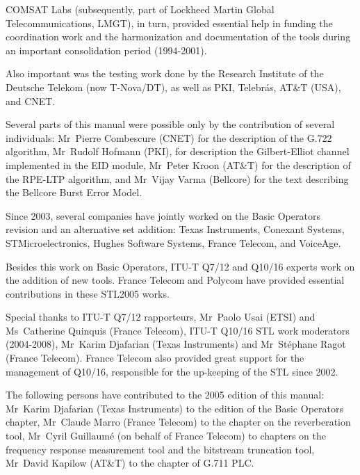 COMSAT Labs (subsequently, part of Lockheed Martin Global Telecommunications, LMGT), in turn, provided essential help in funding the coordination work and the harmonization and documentation of the tools during an important consolidation period (1994-2001).

Also important was the testing work done by the Research Institute of the Deutsche Telekom (now T-Nova/DT), as well as PKI, Telebr\'{a}s, AT\&T (USA), and CNET.

Several parts of this manual were possible only by the contribution of several individuals: Mr~Pierre Combescure (CNET) for the description of the G.722 algorithm, Mr~Rudolf Hofmann (PKI), for description the Gilbert-Elliot channel implemented in the EID module, Mr~Peter Kroon (AT\&T) for the description of the RPE-LTP algorithm, and Mr~Vijay Varma (Bellcore) for the text describing the Bellcore Burst Error Model.

Since 2003, several companies have jointly worked on the Basic Operators revision and an alternative set addition: Texas Instruments, Conexant Systems, STMicroelectronics, Hughes Software Systems, France Telecom, and VoiceAge.

Besides this work on Basic Operators, ITU-T Q7/12 and Q10/16 experts work on the addition of new tools.
France Telecom and Polycom have provided essential contributions in these STL2005 works.

Special thanks to ITU-T Q7/12 rapporteurs, Mr~Paolo Usai (ETSI) and Ms~Catherine Quinquis (France Telecom), ITU-T Q10/16 STL work moderators (2004-2008), Mr~Karim Djafarian (Texas Instruments) and Mr~St\'{e}phane Ragot (France Telecom).
France Telecom also provided great support for the management of Q10/16, responsible for the up-keeping of the STL since 2002.

The following persons have contributed to the 2005 edition of this manual: Mr~Karim Djafarian (Texas Instruments) to the edition of the Basic Operators chapter, Mr~Claude Marro (France Telecom) to the chapter on the reverberation tool, Mr~Cyril Guillaum\'{e} (on behalf of France Telecom) to chapters on the frequency response measurement tool and the bitstream truncation tool, Mr~David Kapilow (AT\&T) to the chapter of G.711 PLC.

